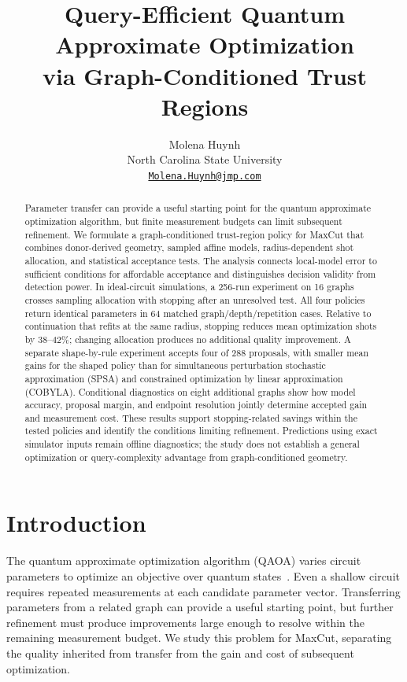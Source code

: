 \documentclass[11pt]{article}
\begin{document}
\raggedbottom
\title{Query-Efficient Quantum Approximate Optimization\\
via Graph-Conditioned Trust Regions}
\author{Molena Huynh\\
 \normalsize North Carolina State University\\
 \normalsize\href{mailto:Molena.Huynh@jmp.com}{\texttt{Molena.Huynh@jmp.com}}}
\date{}
\maketitle
\begin{abstract}
Parameter transfer can provide a useful starting point for the quantum
approximate optimization algorithm, but finite measurement budgets can
limit subsequent refinement. We formulate a graph-conditioned trust-region
policy for MaxCut that combines donor-derived geometry, sampled affine
models, radius-dependent shot allocation, and statistical acceptance tests.
The analysis connects local-model error to sufficient conditions for
affordable acceptance and distinguishes decision validity from detection
power. In ideal-circuit simulations, a 256-run experiment on 16 graphs
crosses sampling allocation with stopping after an unresolved test. All
four policies return identical parameters in 64 matched graph/depth/repetition
cases. Relative to
continuation that refits at the same radius, stopping reduces mean
optimization shots by 38--42\%; changing allocation produces no additional
quality improvement. A separate shape-by-rule experiment accepts four of
288 proposals, with smaller mean gains for the shaped policy than for
simultaneous perturbation stochastic approximation (SPSA) and constrained
optimization by linear approximation (COBYLA). Conditional diagnostics on eight additional graphs show
how model accuracy, proposal margin, and endpoint resolution jointly
determine accepted gain and measurement cost. These results support
stopping-related savings within the tested policies and identify the
conditions limiting refinement. Predictions using exact simulator inputs
remain offline diagnostics; the study does not establish a general
optimization or query-complexity advantage from graph-conditioned geometry.
\end{abstract}

\section{Introduction}
The quantum approximate optimization algorithm (QAOA) varies circuit
parameters to optimize an objective over quantum states~\cite{farhi2014}. Even a shallow circuit
requires repeated measurements at each candidate parameter vector.
Transferring parameters from a related graph can provide a useful starting
point, but further refinement must produce improvements large enough to
resolve within the remaining measurement budget. We study this problem for
MaxCut, separating the quality inherited from transfer from the gain and
cost of subsequent optimization.
\end{document}
